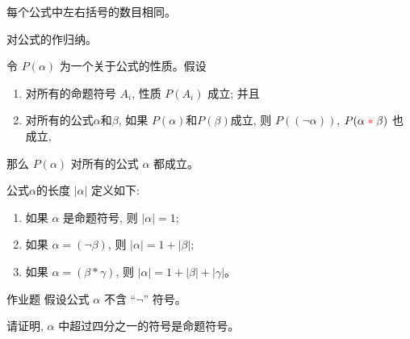 \begin{frame}{}
  \begin{lemma}[公式的括号匹配性质]
    每个公式中左右括号的数目相同。
  \end{lemma}

  \pause
  \vspace{0.60cm}
  \begin{center}
    对公式的作归纳。
  \end{center}
\end{frame}

\begin{frame}{}
  \begin{theorem}[归纳原理]
    令 $P(\alpha)$ 为一个关于公式的性质。假设
    \begin{enumerate}[(1)]
      \setlength{\itemsep}{8pt}
      \item 对所有的命题符号 $A_{i}$, 性质 $P(A_{i})$ 成立; 并且
      \item 对所有的公式$\alpha$和$\beta$, 如果 $P(\alpha)$和$P(\beta)$成立,
        则 $P((\lnot \alpha))$, $P(\alpha \;\textcolor{red}{\ast}\; \beta)$ 也成立,
    \end{enumerate}
    那么 $P(\alpha)$ 对所有的公式 $\alpha$ 都成立。
  \end{theorem}
\end{frame}

\begin{frame}{}
  \begin{definition}[公式的长度]
    公式$\alpha$的长度 $|\alpha|$ 定义如下:
    \begin{enumerate}[(1)]
      \setlength{\itemsep}{8pt}
      \item 如果 $\alpha$ 是命题符号, 则 $|\alpha| = 1$;
      \item 如果 $\alpha = (\lnot \beta)$, 则 $|\alpha| = 1 + |\beta|$;
      \item 如果 $\alpha = (\beta \ast \gamma)$, 则 $|\alpha| = 1 + |\beta| + |\gamma|$。
    \end{enumerate}
  \end{definition}

  \pause
  \vspace{0.30cm}
  \begin{exampleblock}{作业题}
    假设公式 $\alpha$ 不含 ``$\lnot$'' 符号。

    请证明, $\alpha$ 中超过四分之一的符号是命题符号。
  \end{exampleblock}
\end{frame}

